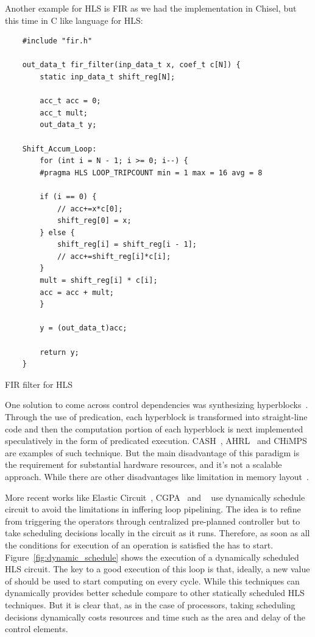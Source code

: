 Another example for HLS is FIR as we had the implementation in Chisel, but this time in C like language for HLS:

\begin{listing}[ht]
    \begin{verbatim}
    #include "fir.h"

    out_data_t fir_filter(inp_data_t x, coef_t c[N]) {
        static inp_data_t shift_reg[N];
    
        acc_t acc = 0;
        acc_t mult;
        out_data_t y;
    
    Shift_Accum_Loop:
        for (int i = N - 1; i >= 0; i--) {
        #pragma HLS LOOP_TRIPCOUNT min = 1 max = 16 avg = 8
    
        if (i == 0) {
            // acc+=x*c[0];
            shift_reg[0] = x;
        } else {
            shift_reg[i] = shift_reg[i - 1];
            // acc+=shift_reg[i]*c[i];
        }
        mult = shift_reg[i] * c[i];
        acc = acc + mult;
        }
    
        y = (out_data_t)acc;
    
        return y;
    }
    \end{verbatim}
    \caption{FIR filter for HLS}
    \label{listing:hls_fir_filter}
\end{listing}

One solution to come across control dependencies was synthesizing hyperblocks~\cite{hyperblock}.
Through the use of predication, each hyperblock is transformed into straight-line code and then the computation portion of each hyperblock is next implemented speculatively in the form of predicated execution.
CASH~\cite{budiu_cash_2002, budiu_pegasus_2002}, AHRL~\cite{ahrl} and CHiMPS~\cite{chimps} are examples of such technique. But the main disadvantage of this paradigm is the requirement for substantial hardware resources, and it's not a scalable approach. While there are other disadvantages like limitation in memory layout~\cite{spatial_computation}.

More recent works like Elastic Circuit~\cite{elasticCircuit, elasticFlow}, CGPA~\cite{cgpa} and ~\cite{josipovic_fpga_2018_dynamically} use dynamically schedule circuit to avoid the limitations in inffering loop pipelining.
The idea is to refine from triggering the operators through centralized pre-planned controller but to take scheduling decisions locally in the circuit as it runs.
Therefore, as soon as all the conditions for execution of an operation is satisfied the has to start.
Figure~\ref{fig:dynamic_schedule} shows the execution of a dynamically scheduled HLS circuit.
The key to a good execution of this loop is that, ideally, a new value of  should be used to start computing  on every cycle.
While this techniques can dynamically provides better schedule compare to other statically scheduled HLS techniques.
But it is clear that, as in the case of processors, taking scheduling decisions dynamically costs resources and time such as the area and delay of the control elements.



